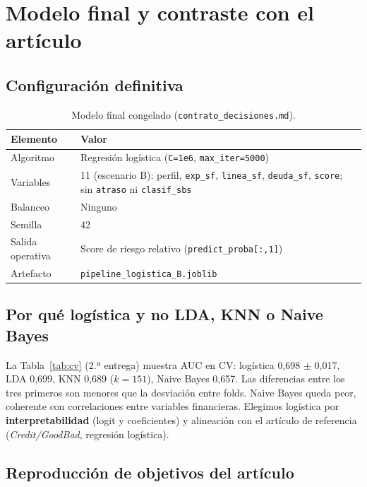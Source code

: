 \documentclass[11pt]{article}
\begin{document}
\section{Modelo final y contraste con el artículo}

\subsection{Configuración definitiva}

\begin{table}[H]
\centering
\caption{Modelo final congelado (\texttt{contrato\_decisiones.md}).}
\label{tab:config}
\small
\begin{tabular}{@{}ll@{}}
\toprule
\textbf{Elemento} & \textbf{Valor} \\
\midrule
Algoritmo & Regresión logística (\texttt{C=1e6}, \texttt{max\_iter=5000}) \\
Variables & 11 (escenario B): perfil, \texttt{exp\_sf}, \texttt{linea\_sf}, \texttt{deuda\_sf}, \texttt{score}; sin \texttt{atraso} ni \texttt{clasif\_sbs} \\
Balanceo & Ninguno \\
Semilla & 42 \\
Salida operativa & Score de riesgo relativo (\texttt{predict\_proba[:,1]}) \\
Artefacto & \texttt{pipeline\_logistica\_B.joblib} \\
\bottomrule
\end{tabular}
\end{table}

\subsection{Por qué logística y no LDA, KNN o Naive Bayes}

La Tabla~\ref{tab:cv} (2.ª entrega) muestra AUC en CV: logística 0,698 $\pm$ 0,017, LDA 0,699, KNN 0,689 ($k=151$), Naive Bayes 0,657. Las diferencias entre los tres primeros son menores que la desviación entre folds. Naive Bayes queda peor, coherente con correlaciones entre variables financieras. Elegimos logística por \textbf{interpretabilidad} (logit y coeficientes) y alineación con el artículo de referencia (\textit{Credit/GoodBad}, regresión logística).

\subsection{Reproducción de objetivos del artículo}
\end{document}

